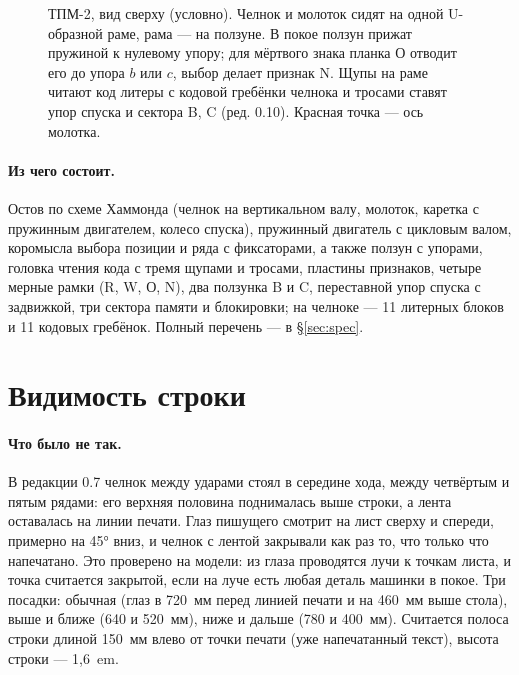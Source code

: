 \begin{figure}[h]
\caption{ТПМ-2, вид сверху (условно). Челнок и молоток сидят на одной U-образной раме, рама — на ползуне. В покое ползун прижат пружиной к нулевому упору; для мёртвого знака планка О отводит его до упора $b$ или $c$, выбор делает признак N. Щупы на раме читают код литеры с кодовой гребёнки челнока и тросами ставят упор спуска и сектора B, C (ред. 0.10). Красная точка — ось молотка.}
\label{fig:top}
\end{figure}

\paragraph{Из чего состоит.} Остов по схеме Хаммонда (челнок на вертикальном валу, молоток, каретка с пружинным двигателем, колесо спуска), пружинный двигатель с цикловым валом, коромысла выбора позиции и ряда с фиксаторами, а также ползун с упорами, головка чтения кода с тремя щупами и тросами, пластины признаков, четыре мерные рамки (R, W, О, N), два ползунка B и C, переставной упор спуска с задвижкой, три сектора памяти и блокировки; на челноке — 11 литерных блоков и 11 кодовых гребёнок. Полный перечень — в \S\ref{sec:spec}.

\section{Видимость строки}
\label{sec:vis}
\begingroup\sloppy

\paragraph{Что было не так.} В редакции 0.7 челнок между ударами стоял в середине хода, между четвёртым и пятым рядами: его верхняя половина поднималась выше строки, а лента оставалась на линии печати. Глаз пишущего смотрит на лист сверху и спереди, примерно на 45° вниз, и челнок с лентой закрывали как раз то, что только что напечатано. Это проверено на модели: из глаза проводятся лучи к точкам листа, и точка считается закрытой, если на луче есть любая деталь машинки в покое. Три посадки: обычная (глаз в 720~мм перед линией печати и на 460~мм выше стола), выше и ближе (640 и 520~мм), ниже и дальше (780 и 400~мм). Считается полоса строки длиной 150~мм влево от точки печати (уже напечатанный текст), высота строки — 1,6~em.

